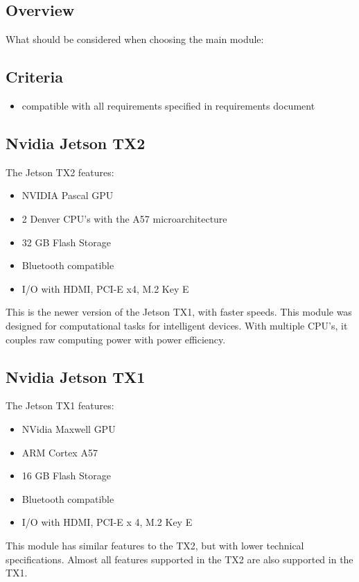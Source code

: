 \documentclass[onecolumn, draftclsnofoot,10pt, compsoc]{IEEEtran}
\begin{document}
\subsection{Overview}
What should be considered when choosing the main module:
\subsection{Criteria}
\begin{itemize}
    \item compatible with all requirements specified in requirements document
\end{itemize}

\subsection{Nvidia Jetson TX2}
The Jetson TX2 features:
\begin{itemize}
    \item NVIDIA Pascal GPU
    \item 2 Denver CPU's with the A57 microarchitecture
    \item 32 GB Flash Storage
    \item Bluetooth compatible
    \item I/O with HDMI, PCI-E x4, M.2 Key E
\end{itemize}
This is the newer version of the Jetson TX1, with faster speeds. This module was designed for computational tasks for intelligent devices. With multiple CPU's, it couples raw computing power with power efficiency. 
~\cite{tx2:specs}

\subsection{Nvidia Jetson TX1}
The Jetson TX1 features:
\begin{itemize}
    \item NVidia Maxwell GPU
    \item ARM Cortex A57
    \item 16 GB Flash Storage
    \item Bluetooth compatible
    \item I/O with HDMI, PCI-E x 4, M.2 Key E
\end{itemize}
This module has similar features to the TX2, but with lower technical specifications. Almost all features supported in the TX2 are also supported in the TX1.
~\cite{tx1:specs}
\end{document}
